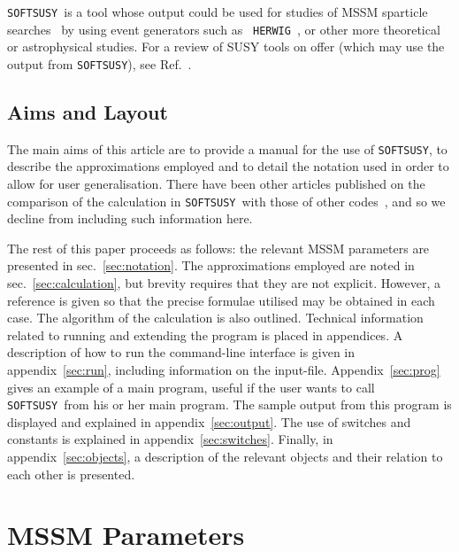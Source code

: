 \documentclass[]{article}
\def\SOFTSUSY{{\tt SOFTSUSY}}
\begin{document}
\SOFTSUSY~is
a tool whose output could be used for studies of MSSM sparticle
searches~\cite{Allanach:2000ii} by using event generators such as {\tt
  HERWIG}~\cite{Corcella:2000bw}, or other more theoretical or astrophysical
studies. 
For a review of SUSY tools on offer (which may use the output from \SOFTSUSY),
see 
Ref.~\cite{Allanach:2008zn}. 

\subsection{Aims and Layout}

The main aims of this article are to provide a manual for the use of \SOFTSUSY,
to describe the approximations employed and to detail the notation used in
order to
allow for user generalisation. There have been other articles published on the
comparison of the calculation in \SOFTSUSY~with those of other
codes~\cite{comparison}, and so we decline from including such
information here.

The rest of this paper proceeds as follows: 
the relevant MSSM parameters are presented in
sec.~\ref{sec:notation}. The approximations employed are noted in
sec.~\ref{sec:calculation}, but brevity requires that they are not
explicit. However, a reference is given so that the precise formulae utilised
may be obtained in each case. The algorithm of the calculation is also
outlined.
Technical information related to running and extending the program is
placed in appendices.
A description of how to run the command-line interface is given in
appendix~\ref{sec:run}, including information on the input-file.
Appendix~\ref{sec:prog} gives an
example of a main program, useful if the user wants to
call \SOFTSUSY~from his or her main program.
The sample output from this program is displayed and explained in
appendix~\ref{sec:output}. 
The use of switches and constants is explained
in appendix~\ref{sec:switches}. Finally, in appendix~\ref{sec:objects}, 
a description of the relevant objects and their relation to each other is
presented. 

\section{MSSM Parameters \label{sec:notation}}
\end{document}
